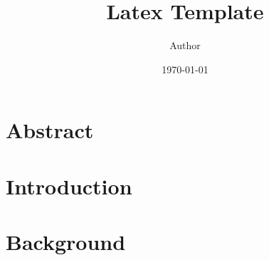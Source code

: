 \documentclass{article}
\title{Latex Template}
\author{Author}
\date{\today}
\begin{document}
\maketitle

\section*{Abstract}

\newpage

\section{Introduction}


\section{Background}





\newpage
\appendix
\end{document}
